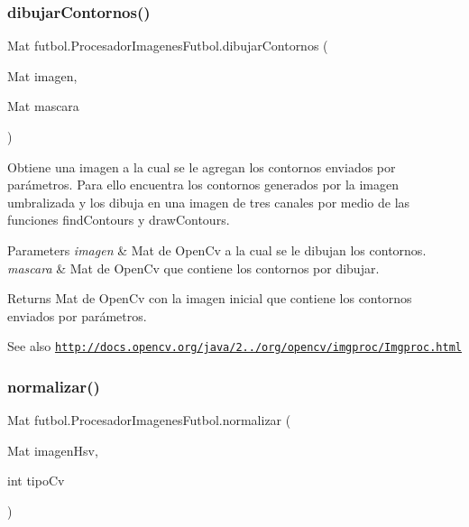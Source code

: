 \subsubsection{\texorpdfstring{dibujar\+Contornos()}{dibujarContornos()}}
{\footnotesize\ttfamily Mat futbol.\+Procesador\+Imagenes\+Futbol.\+dibujar\+Contornos (\begin{DoxyParamCaption}\item[{Mat}]{imagen,  }\item[{Mat}]{mascara }\end{DoxyParamCaption})\hspace{0.3cm}{\ttfamily [private]}}

Obtiene una imagen a la cual se le agregan los contornos enviados por parámetros. Para ello encuentra los contornos generados por la imagen umbralizada y los dibuja en una imagen de tres canales por medio de las funciones find\+Contours y draw\+Contours. 
\begin{DoxyParams}{Parameters}
{\em imagen} & Mat de Open\+Cv a la cual se le dibujan los contornos. \\
\hline
{\em mascara} & Mat de Open\+Cv que contiene los contornos por dibujar. \\
\hline
\end{DoxyParams}
\begin{DoxyReturn}{Returns}
Mat de Open\+Cv con la imagen inicial que contiene los contornos enviados por parámetros. 
\end{DoxyReturn}
\begin{DoxySeeAlso}{See also}
\href{http://docs.opencv.org/java/2.4.2/org/opencv/imgproc/Imgproc.html}{\tt http\+://docs.\+opencv.\+org/java/2../org/opencv/imgproc/\+Imgproc.\+html} 
\end{DoxySeeAlso}
\hypertarget{classfutbol_1_1_procesador_imagenes_futbol_a4bd6c7ed45428bdf30970bb9292bce02}{}\label{classfutbol_1_1_procesador_imagenes_futbol_a4bd6c7ed45428bdf30970bb9292bce02} 
\subsubsection{\texorpdfstring{normalizar()}{normalizar()}}
{\footnotesize\ttfamily Mat futbol.\+Procesador\+Imagenes\+Futbol.\+normalizar (\begin{DoxyParamCaption}\item[{Mat}]{imagen\+Hsv,  }\item[{int}]{tipo\+Cv }\end{DoxyParamCaption})\hspace{0.3cm}{\ttfamily [private]}}

